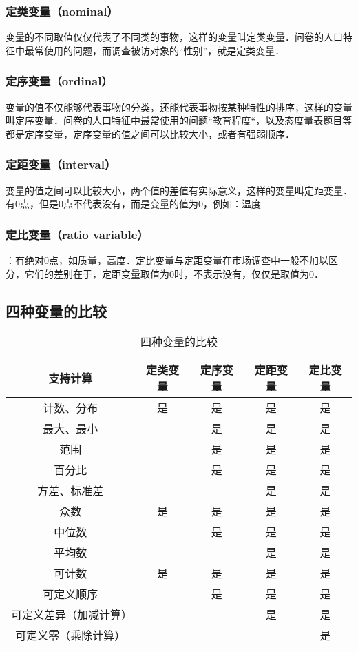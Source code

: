 \subsubsection{定类变量（nominal）}
变量的不同取值仅仅代表了不同类的事物，这样的变量叫定类变量．问卷的人口特征中最常使用的问题，而调查被访对象的“性别”，就是定类变量．
\subsubsection{定序变量（ordinal）}
变量的值不仅能够代表事物的分类，还能代表事物按某种特性的排序，这样的变量叫定序变量．问卷的人口特征中最常使用的问题“教育程度“，以及态度量表题目等都是定序变量，定序变量的值之间可以比较大小，或者有强弱顺序．
\subsubsection{定距变量（interval）}
变量的值之间可以比较大小，两个值的差值有实际意义，这样的变量叫定距变量．有0点，但是0点不代表没有，而是变量的值为0，例如：温度
\subsubsection{定比变量（ratio variable）}：有绝对0点，如质量，高度．定比变量与定距变量在市场调查中一般不加以区分，它们的差别在于，定距变量取值为0时，不表示没有，仅仅是取值为0．
\subsection{四种变量的比较}
\begin{table}[ht]
\centering
\caption{四种变量的比较}\label{DatTyp_tab1}
\begin{tabular}{|c|c|c|c|c|}
\hline
支持计算 & 定类变量 & 定序变量 & 定距变量 & 定比变量 \\
\hline
计数、分布 & 是 & 是 & 是 & 是 \\
\hline
最大、最小 &   & 是 & 是 & 是 \\
\hline
范围 &   & 是 & 是 & 是 \\
\hline
百分比 &   & 是 & 是 & 是 \\
\hline
方差、标准差 &   &   & 是 & 是 \\
\hline
众数 & 是 & 是 & 是 & 是 \\
\hline
中位数 &   & 是 & 是 & 是 \\
\hline
平均数 &   &   & 是 & 是 \\
\hline
可计数 & 是 & 是 & 是 & 是 \\
\hline
可定义顺序 &   & 是 & 是 & 是 \\
\hline
可定义差异（加减计算） &   &   & 是 & 是 \\
\hline
可定义零（乘除计算） &   &   &   & 是 \\
\hline
\end{tabular}
\end{table}
